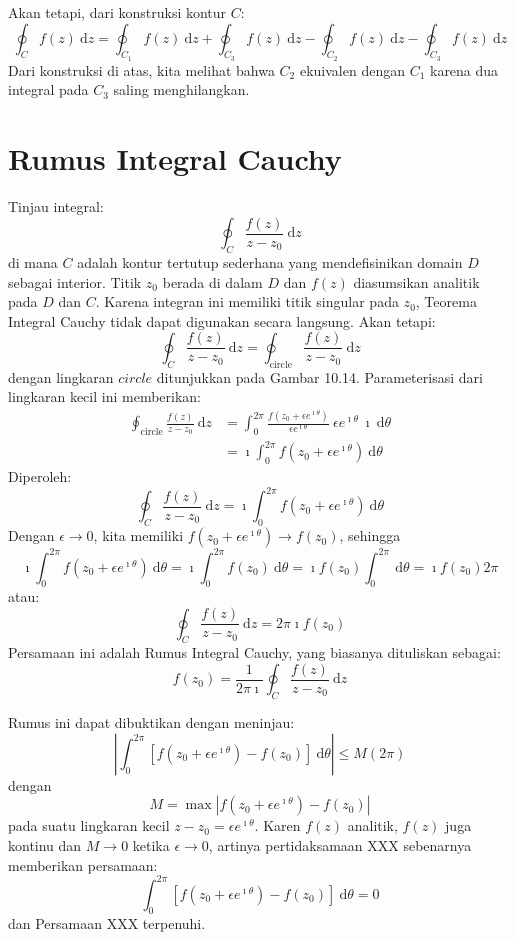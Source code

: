 Akan tetapi, dari konstruksi kontur $C$:
\begin{equation*}
\oint_{C}f(z)\ \mathrm{d}z = \oint_{C_{1}}f(z)\ \mathrm{d}z +
\oint_{C_{3}}f(z)\ \mathrm{d}z - \oint_{C_{2}}f(z)\ \mathrm{d}z - 
\oint_{C_{3}}f(z)\ \mathrm{d}z
\end{equation*}
Dari konstruksi di atas, kita melihat bahwa $C_{2}$ ekuivalen dengan
$C_{1}$ karena dua integral pada $C_{3}$ saling menghilangkan.


\section{Rumus Integral Cauchy}


Tinjau integral:
\[
\oint_{C}\frac{f(z)}{z-z_{0}}\ \mathrm{d}z
\]
di mana $C$ adalah kontur tertutup sederhana yang mendefisinikan
domain $D$ sebagai interior. Titik $z_{0}$ berada di dalam $D$
dan $f(z)$ diasumsikan analitik pada $D$ dan $C$. Karena integran
ini memiliki titik singular pada $z_{0}$, Teorema Integral Cauchy
tidak dapat digunakan secara langsung. Akan tetapi:
\[
\oint_{C}\frac{f(z)}{z-z_{0}}\ \mathrm{d}z=\oint_{\text{circle}}\frac{f(z)}{z-z_{0}}\ \mathrm{d}z
\]
dengan lingkaran $\textit{circle}$ ditunjukkan pada Gambar 10.14.
Parameterisasi dari lingkaran kecil ini memberikan:
\begin{align*}
\oint_{\text{circle}}\frac{f(z)}{z-z_{0}}\ \mathrm{d}z & =\int_{0}^{2\pi}\frac{f(z_{0}+\epsilon e^{\imath\theta})}{\epsilon e^{\imath\theta}}\ \epsilon e^{\imath\theta}\ \imath\ \mathrm{d}\theta\\
 & =\imath\int_{0}^{2\pi}f(z_{0}+\epsilon e^{\imath\theta})\ \mathrm{d}\theta
\end{align*}
Diperoleh:
\[
\oint_{C}\frac{f(z)}{z-z_{0}}\ \mathrm{d}z=\imath\int_{0}^{2\pi}f(z_{0}+\epsilon e^{\imath\theta})\ \mathrm{d}\theta
\]
Dengan $\epsilon\rightarrow0$, kita memiliki $f(z_{0}+\epsilon e^{\imath\theta})\rightarrow f(z_{0})$,
sehingga
\[
\imath\int_{0}^{2\pi}f(z_{0}+\epsilon e^{\imath\theta})\ \mathrm{d}\theta=\imath\int_{0}^{2\pi}f(z_{0})\ \mathrm{d}\theta=\imath f(z_{0})\int_{0}^{2\pi}\ \mathrm{d}\theta=\imath f(z_{0})2\pi
\]
atau:
\[
\oint_{C}\frac{f(z)}{z-z_{0}}\ \mathrm{d}z=2\pi\imath f(z_{0})
\]
Persamaan ini adalah Rumus Integral Cauchy, yang biasanya dituliskan
sebagai:
\[
f(z_{0})=\frac{1}{2\pi\imath}\oint_{C}\frac{f(z)}{z-z_{0}}\ \mathrm{d}z
\]

Rumus ini dapat dibuktikan dengan meninjau:
\[
\left|\int_{0}^{2\pi}\left[f(z_{0}+\epsilon e^{\imath\theta})-f(z_{0})\right]\ \mathrm{d}\theta\right|\leq M(2\pi)
\]
dengan
\[
M=\max\left|f(z_{0}+\epsilon e^{\imath\theta})-f(z_{0})\right|
\]
pada suatu lingkaran kecil $z-z_{0}=\epsilon e^{\imath\theta}$. Karen
$f(z)$ analitik, $f(z)$ juga kontinu dan $M\rightarrow0$ ketika
$\epsilon\rightarrow0$, artinya pertidaksamaan XXX sebenarnya memberikan
persamaan:
\[
\int_{0}^{2\pi}\left[f(z_{0}+\epsilon e^{\imath\theta})-f(z_{0})\right]\ \mathrm{d}\theta=0
\]
dan Persamaan XXX terpenuhi.

